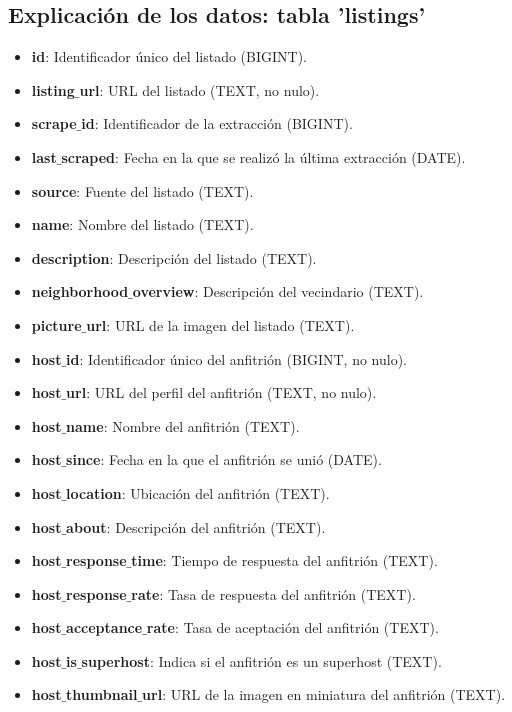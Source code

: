 \newpage
\subsection*{Explicación de los datos: tabla 'listings'}

\begin{itemize}[topsep=0pt, partopsep=0pt, itemsep=0pt, parsep=0pt]
\item \textbf{id}: Identificador único del listado (BIGINT).
\item \textbf{listing$\_$url}: URL del listado (TEXT, no nulo).
\item \textbf{scrape$\_$id}: Identificador de la extracción (BIGINT).
\item \textbf{last$\_$scraped}: Fecha en la que se realizó la última extracción (DATE).
\item \textbf{source}: Fuente del listado (TEXT).
\item \textbf{name}: Nombre del listado (TEXT).
\item \textbf{description}: Descripción del listado (TEXT).
\item \textbf{neighborhood$\_$overview}: Descripción del vecindario (TEXT).
\item \textbf{picture$\_$url}: URL de la imagen del listado (TEXT).
\item \textbf{host$\_$id}: Identificador único del anfitrión (BIGINT, no nulo).
\item \textbf{host$\_$url}: URL del perfil del anfitrión (TEXT, no nulo).
\item \textbf{host$\_$name}: Nombre del anfitrión (TEXT).
\item \textbf{host$\_$since}: Fecha en la que el anfitrión se unió (DATE).
\item \textbf{host$\_$location}: Ubicación del anfitrión (TEXT).
\item \textbf{host$\_$about}: Descripción del anfitrión (TEXT).
\item \textbf{host$\_$response$\_$time}: Tiempo de respuesta del anfitrión (TEXT).
\item \textbf{host$\_$response$\_$rate}: Tasa de respuesta del anfitrión (TEXT).
\item \textbf{host$\_$acceptance$\_$rate}: Tasa de aceptación del anfitrión (TEXT).
\item \textbf{host$\_$is$\_$superhost}: Indica si el anfitrión es un superhost (TEXT).
\item \textbf{host$\_$thumbnail$\_$url}: URL de la imagen en miniatura del anfitrión (TEXT).

\end{itemize}
